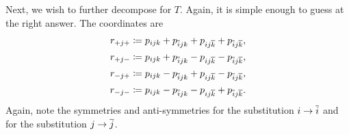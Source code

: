 Next, we wish to further decompose for \(T\). Again, it is simple enough to guess at the right answer. The 
coordinates are
\begin{align}
r_{+j+} & \coloneqq p_{ijk} + p_{\overline{i}jk} + p_{ij\overline{k}} + p_{\overline{i} j\overline{k}}, \\
r_{+j-} & \coloneqq p_{ijk} + p_{\overline{i}jk} - p_{ij\overline{k}} - p_{\overline{i} j\overline{k}}, \\
r_{-j+} & \coloneqq p_{ijk} - p_{\overline{i}jk} + p_{ij\overline{k}} - p_{\overline{i}j\overline{k}}, \\
r_{-j-} & \coloneqq p_{ijk} - p_{\overline{i}jk} - p_{ij\overline{k}} + p_{\overline{i}j\overline{k}}. 
\end{align}
Again, note the symmetries and anti-symmetries for the substitution \(i \to \overline{i}\) and for the
substitution \(j \to \overline{j}\).
